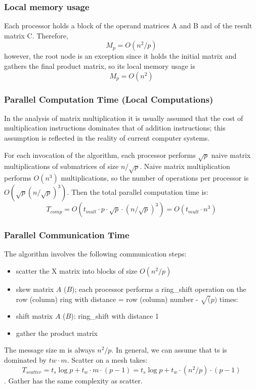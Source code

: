 \documentclass{article}
\begin{document}
\subsubsection{Local memory usage}

Each processor holds a block of the operand matrices A and B and of the result
matrix C. Therefore, $$M_p = O(n^2/p)$$ however, the root node is an exception
since it holds the initial matrix and gathers the final product matrix, so its
local memory usage is $$M_p = O(n^2)$$

\subsubsection{Parallel Computation Time (Local Computations)}

In the analysis of matrix multiplication it is usually assumed that the cost of
multiplication instructions dominates that of addition instructions; this
assumption is reflected in the reality of current computer systems.

For each invocation of the algorithm, each processor performs $\sqrt{p}$ naive
matrix multiplications of submatrices of size $n/\sqrt{p}$. Naive matrix
multiplication performs $O(n^3)$ multiplications, so the number of operations
per processor is $O(\sqrt{p}(n/\sqrt{p})^3)$. Then the total parallel
computation time is: $$T_{{comp}} = O(t_{{mult}} \cdot p \cdot \sqrt{p} \cdot
(n/\sqrt{p})^3) = O(t_{{mult}} \cdot n^3)$$


\subsubsection{Parallel Communication Time}

The algorithm involves the following communication steps:
\begin{itemize}
	\item scatter the X matrix into blocks of size $O(n^2/p)$
	\item skew matrix $A$ ($B$); each processor performs a ring\_shift operation on
	the row (column) ring with distance = row (column) number - $\sqrt(p)$ times:
	\item shift matrix $A$ ($B$): ring\_shift with distance 1
	\item gather the product matrix
\end{itemize}

The message size m is always $n^2/p$. In general, we can assume that ts is
dominated by $tw \cdot m$. Scatter on a mesh takes: $$T_{{scatter}} = t_s
\log{p} + t_w \cdot m  \cdot (p-1) = t_s \log{p} + t_w \cdot (n^2/p) \cdot
(p-1)$$. Gather has the same complexity as scatter.
\end{document}
